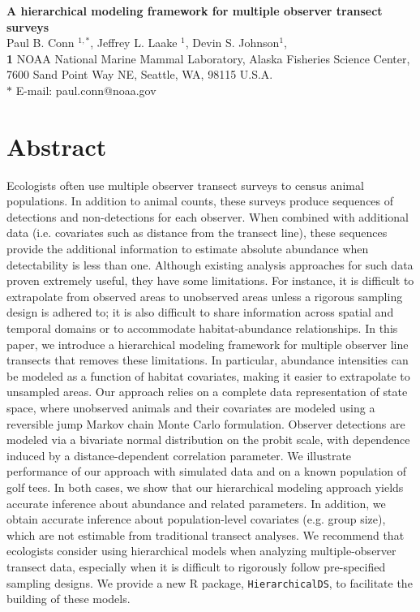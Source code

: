 \documentclass[10pt]{article}
\date{}
\begin{document}
\begin{flushleft}
{\Large
\textbf{A hierarchical modeling framework for multiple observer transect surveys} }
\\
Paul B. Conn $^{1,\ast}$,
Jeffrey L. Laake $^{1}$,
Devin S. Johnson$^{1}$,
\\
{\bf{1}} NOAA National Marine Mammal Laboratory, Alaska Fisheries Science Center,
7600 Sand Point Way NE, Seattle, WA, 98115 U.S.A.
\\
$\ast$ E-mail: paul.conn@noaa.gov
\end{flushleft}

\section*{Abstract}
Ecologists often use multiple observer transect surveys to census animal populations.  In addition to animal counts, these surveys produce sequences of detections and non-detections for each observer.  When combined with additional data (i.e. covariates such as distance from the transect line), these sequences provide the additional information to estimate absolute abundance when detectability is less than one.  Although existing analysis approaches for such data proven extremely useful, they have some limitations.  For instance, it is difficult to extrapolate from observed areas to unobserved areas unless a rigorous sampling design is adhered to; it is also difficult to share information across spatial and temporal domains or to accommodate habitat-abundance relationships.  In this paper, we introduce a hierarchical modeling framework for multiple observer line transects that removes these limitations.  In particular, abundance intensities can be modeled as a function of habitat covariates, making it easier to extrapolate to unsampled areas.  Our approach relies on a complete data representation of state space, where unobserved animals and their covariates are modeled using a reversible jump Markov chain Monte Carlo formulation.  Observer detections are modeled via a bivariate normal distribution on the probit scale, with dependence induced by a distance-dependent correlation parameter.  We illustrate performance of our approach with simulated data and on a known population of golf tees.  In both cases, we show that our hierarchical modeling approach yields accurate inference about abundance and related parameters.  In addition, we obtain accurate inference about population-level covariates (e.g. group size), which are not estimable from traditional transect analyses.  We recommend that ecologists consider using hierarchical models when analyzing multiple-observer transect data, especially when it is difficult to rigorously follow pre-specified sampling designs.  We provide a new R package, {\tt HierarchicalDS}, to facilitate the building of these models. 
\end{document}

